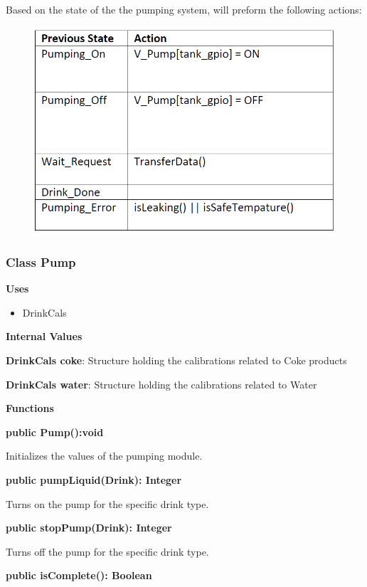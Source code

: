 \documentclass [10pt]{article}
\begin{document}
Based on the state of the the pumping system, will preform the following actions:
\begin{figure} [h!]
	\centering
	\includegraphics [scale = 0.4] {figures/Pumping_PerformActions.png}
\end{figure}


\subsubsection{Class Pump}

\textbf{Uses}

\begin{itemize}
	\item DrinkCals
\end{itemize}

\textbf{Internal Values}

\textbf{DrinkCals coke}: Structure holding the calibrations related to Coke products

\textbf{DrinkCals water}: Structure holding the calibrations related to Water

\textbf{Functions}

\textbf{public Pump():void}

Initializes the values of the pumping module.

\textbf{public pumpLiquid(Drink): Integer}

Turns on the pump for the specific drink type.

\textbf{public stopPump(Drink): Integer}

Turns off the pump for the specific drink type.

\textbf{public isComplete(): Boolean}
\end{document}
